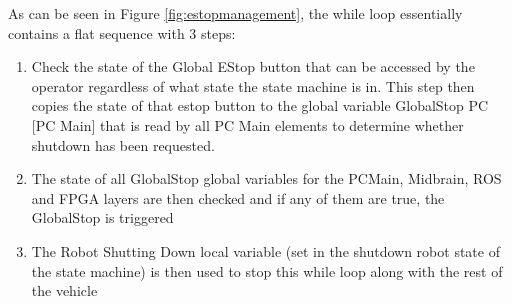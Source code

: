 \noindent As can be seen in Figure \ref{fig:estopmanagement}, the while loop essentially contains a flat sequence with 3 steps:

\begin{enumerate}
\item Check the state of the Global EStop button that can be accessed by the operator regardless of what state the state machine is in. This step then copies the state of that estop button to the global variable GlobalStop PC [PC Main] that is read by all PC Main elements to determine whether shutdown has been requested.
\item The state of all GlobalStop global variables for the PCMain, Midbrain, ROS and FPGA layers are then checked and if any of them are true, the GlobalStop is triggered
\item The Robot Shutting Down local variable (set in the shutdown robot state of the state machine) is then used to stop this while loop along with the rest of the vehicle
\end{enumerate}
